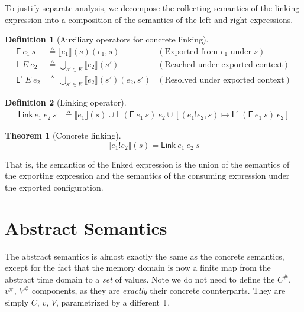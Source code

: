 \documentclass[acmsmall,screen]{acmart}
\theoremstyle{definition}
\newtheorem{definition}{Definition}[section]
\newtheorem{thm}{Theorem}[section]
\newcommand*{\A}[1]{{#1}^{\#}}
\newcommand*{\Time}{\mathbb{T}}
\newcommand*{\ATime}{\A{\Time}}
\newcommand*{\Ctx}[1]{\text{Ctx}\vphantom{#1}}
\newcommand*{\Value}[1]{\text{Val}\vphantom{#1}}
\newcommand*{\mem}{m}
\newcommand*{\AMem}[1]{\A{\text{Mem}}\vphantom{#1}}
\newcommand*{\AConfig}[1]{\A{\text{Config}}\vphantom{#1}}
\newcommand*{\AResult}[1]{\A{\text{Result}}\vphantom{#1}}
\newcommand*{\link}[2]{{#1}\mathtt{!}{#2}}
\newcommand*{\EE}{\mathsf{E}}
\newcommand*{\LL}{\mathsf{L}}
\newcommand*{\Link}{\mathsf{Link}}
\newcommand*{\sembracket}[1]{\lBrack{#1}\rBrack}
\newcommand*{\fin}[2]{{#1}\xrightarrow{\text{fin}}{#2}}
\begin{document}
To justify separate analysis, we decompose the collecting semantics of the linking expression into a composition of the semantics of the left and right expressions.

\begin{definition}[Auxiliary operators for concrete linking]
  \begin{align*}
    \EE\:e_1\:s         & \triangleq\sembracket{e_1}(s)(e_1,s)                    & (\text{Exported from }e_1\text{ under }s) \\
    \LL\:E\:e_2         & \triangleq\bigcup_{s'\in E}\sembracket{e_2}(s')         & (\text{Reached under exported context})   \\
    \LL^{\circ}\:E\:e_2 & \triangleq\bigcup_{s'\in E}\sembracket{e_2}(s')(e_2,s') & (\text{Resolved under exported context})
  \end{align*}
\end{definition}

\begin{definition}[Linking operator]
  \begin{align*}
    \Link\:e_1\:e_2\:s & \triangleq\sembracket{e_1}(s)\cup\LL\:(\EE\:e_1\:s)\:e_2\cup[(\link{e_1}{e_2},s)\mapsto\LL^{\circ}\:(\EE\:e_1\:s)\:e_2]
  \end{align*}
\end{definition}

\begin{thm}[Concrete linking]
  \[
    \sembracket{\link{e_1}{e_2}}(s)=\Link\:e_1\:e_2\:s
  \]

  That is, the semantics of the linked expression is the union of the semantics of the exporting expression and the semantics of the consuming expression under the exported configuration.
\end{thm}

\section{Abstract Semantics}

The abstract semantics is almost exactly the same as the concrete semantics, except for the fact that the memory domain is now a finite map from the abstract time domain to a \emph{set} of values.
Note we do not need to define the $\A{C}$, $\A{v}$, $\A{V}$ components, as they are \emph{exactly} their concrete counterparts.
They are simply $C$, $v$, $V$, parametrized by a different $\Time$.

\end{document}
